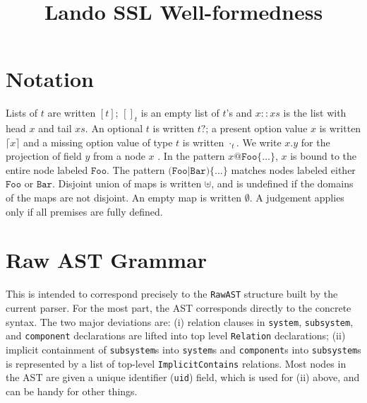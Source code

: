 \documentclass{article}
\begin{document}
\title{Lando SSL Well-formedness}
\maketitle

\section{Notation}

\newcommand{\nt}[1]{\ensuremath{\mathit{#1}}}
\newcommand{\lab}[1]{\ensuremath{\texttt{#1}}}
\newcommand{\listof}[1]{\ensuremath{[{#1}]}}
\newcommand{\nillist}[1]{[]_{#1}}
\newcommand{\conslist}[2]{{#1}::{#2}}
\newcommand{\optof}[1]{\ensuremath{{#1}?}}
\newcommand{\some}[1]{\lceil{#1}\rceil}
\newcommand{\none}[1]{\cdot_{#1}}
\newcommand{\proj}[2]{\ensuremath{{#1}.{#2}}}
\newcommand{\emptym}{\emptyset} 

Lists of $t$ are written $\listof{t}$; $\nillist{t}$ is an empty list of $t$'s and $\conslist{x}{xs}$ is the list with head $x$ and tail $xs$.
An optional $t$ is written $\optof{t}$; a present option value $x$ is written $\some{x}$ and a missing option value of type $t$ is written $\none{t}$.
We write $\proj{x}{y}$ for the projection of field $y$ from a node $x$ .
In the pattern $x@\lab{Foo}\{\ldots\}$, $x$ is bound to the entire node labeled $\lab{Foo}$.
The pattern $\lab{(Foo|Bar)}\{\ldots\}$ matches nodes labeled either $\lab{Foo}$ or $\lab{Bar}$.
Disjoint union of maps is written $\uplus$, and is undefined if the domains of the maps are not disjoint.  An empty map is written $\emptym$.
A judgement applies only if all premises are fully defined.
\section{Raw AST Grammar}

This is intended to correspond precisely to the {\tt RawAST} structure built by the current parser. For the most part, the
AST corresponds directly to the concrete syntax. The two major deviations are: (i) relation clauses in {\tt system}, {\tt subsystem}, and
{\tt component} declarations are lifted into top level {\tt Relation} declarations; (ii) implicit containment of {\tt subsystem}s into
{\tt system}s and {\tt component}s into {\tt subsystem}s is represented by a list of top-level {\tt ImplicitContains} relations.
Most nodes in the AST are given a unique identifier ({\tt uid}) field, which is used for (ii) above, and can be handy for other things.
\end{document}

